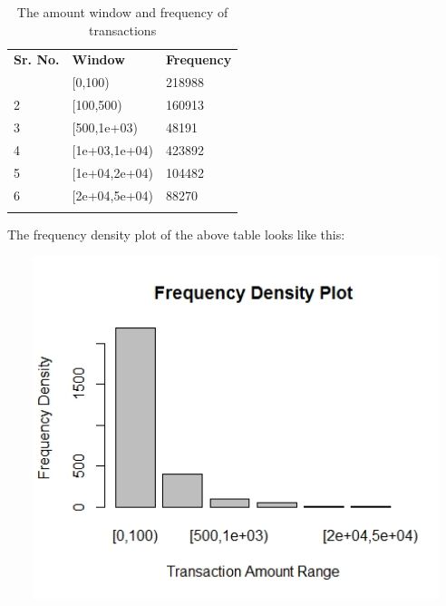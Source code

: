 \begin{table}[h!]
  \begin{center}
    \caption{The amount window and frequency of transactions}
    \label{tab:The amount window and frequency of transactions}
    \begin{tabular}{l|l|l} %
      \hline
      \textbf{Sr. No.} & \textbf{Window} & \textbf{Frequency}\\
	\hdashline
	\hdashline
      1  &     [0,100) & 218988\\
	\hline
	2  &   [100,500) & 160913\\
	\hline
	3  & [500,1e+03) & 48191\\
	\hline
	4  & [1e+03,1e+04) & 423892\\
	\hline
	5 &  [1e+04,2e+04) & 104482\\
	\hline
	6 &  [2e+04,5e+04) & 88270\\
	\hdashline
	\hline
    \end{tabular}
  \end{center}
\end{table}

The frequency density plot of the above table looks like this:
				\begin{center}
				\includegraphics[width=15cm,height=10cm]{figures/freq-density-plot.jpeg}	
				\label{fig: Frequency density plot of the Transaction Amount}
				\end{center}

